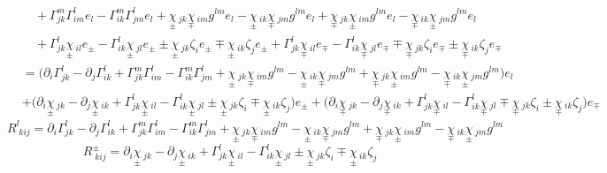 \documentclass[a4paper,11pt]{article}
\numberwithin{equation}{section}
\theoremstyle{definition}
\begin{document}
\begin{align*}
    &\quad + \Gamma_{jk}^m\Gamma_{im}^l e_l - \Gamma_{ik}^m\Gamma_{jm}^l e_l + \underset{\pm}{\chi}\,_{jk}\underset{\mp}{\chi}\,_{im}g^{lm} e_l - \underset{\pm}{\chi}\,_{ik}\underset{\mp}{\chi}\,_{jm}g^{lm} e_l + \underset{\mp}{\chi}\,_{jk}\underset{\pm}{\chi}\,_{im}g^{lm} e_l - \underset{\mp}{\chi}\,_{ik}\underset{\pm}{\chi}\,_{jm}g^{lm} e_l\\
    &\quad + \Gamma_{jk}^l\underset{\pm}{\chi}\,_{il} e_\pm - \Gamma_{ik}^l\underset{\pm}{\chi}\,_{jl} e_\pm \pm \underset{\pm}{\chi}\,_{jk}\zeta_i e_\pm \mp \underset{\pm}{\chi}\,_{ik}\zeta_j e_\pm + \Gamma_{jk}^l\underset{\mp}{\chi}\,_{il} e_\mp - \Gamma_{ik}^l\underset{\mp}{\chi}\,_{jl} e_\mp \mp \underset{\mp}{\chi}\,_{jk}\zeta_i e_\mp \pm \underset{\mp}{\chi}\,_{ik}\zeta_j e_\mp\\
    &= \Big(\partial_i\Gamma_{jk}^l - \partial_j\Gamma_{ik}^l + \Gamma_{jk}^m\Gamma_{im}^l - \Gamma_{ik}^m\Gamma_{jm}^l + \underset{\pm}{\chi}\,_{jk}\underset{\mp}{\chi}\,_{im}g^{lm} - \underset{\pm}{\chi}\,_{ik}\underset{\mp}{\chi}\,_{jm}g^{lm} + \underset{\mp}{\chi}\,_{jk}\underset{\pm}{\chi}\,_{im}g^{lm} - \underset{\mp}{\chi}\,_{ik}\underset{\pm}{\chi}\,_{jm}g^{lm} \Big) e_l\\
    &+\!\!\Big(\!\partial_i\underset{\pm}{\chi}\,_{jk}\!-\!\partial_j\underset{\pm}{\chi}\,_{ik}\!+\!\Gamma_{jk}^l\underset{\pm}{\chi}\,_{il}\!-\!\!\Gamma_{ik}^l\underset{\pm}{\chi}\,_{jl}\!\pm\!\underset{\pm}{\chi}\,_{jk}\zeta_i\!\mp\!\underset{\pm}{\chi}\,_{ik}\zeta_j\!\Big)e_\pm\!\!+\!\!\Big(\!\!\partial_i\underset{\mp}{\chi}\,_{jk}\!\!-\!\partial_j\underset{\mp}{\chi}\,_{ik}\!\!+\!\Gamma_{jk}^l\underset{\mp}{\chi}\,_{il}\!-\!\Gamma_{ik}^l\underset{\mp}{\chi}\,_{jl}\!\mp\!\underset{\mp}{\chi}\,_{jk}\zeta_i\!\pm\!\underset{\mp}{\chi}\,_{ik}\zeta_j\!\Big) e_\mp
\end{align*}
\begin{equation}
    \boxed{R^l_{\;kij}=\partial_i\Gamma_{jk}^l \!-\! \partial_j\Gamma_{ik}^l \!+\! \Gamma_{jk}^m\Gamma_{im}^l \!-\! \Gamma_{ik}^m\Gamma_{jm}^l \!+\! \underset{\pm}{\chi}\,_{jk}\underset{\mp}{\chi}\,_{im}g^{lm} \!-\! \underset{\pm}{\chi}\,_{ik}\underset{\mp}{\chi}\,_{jm}g^{lm} \!+\! \underset{\mp}{\chi}\,_{jk}\underset{\pm}{\chi}\,_{im}g^{lm} \!-\! \underset{\mp}{\chi}\,_{ik}\underset{\pm}{\chi}\,_{jm}g^{lm}}
\end{equation}
\begin{equation}
    \boxed{R^\pm_{\;kij}=\partial_i\underset{\pm}{\chi}\,_{jk}-\partial_j\underset{\pm}{\chi}\,_{ik}+\Gamma_{jk}^l\underset{\pm}{\chi}\,_{il}-\Gamma_{ik}^l\underset{\pm}{\chi}\,_{jl}\pm\underset{\pm}{\chi}\,_{jk}\zeta_i\mp\underset{\pm}{\chi}\,_{ik}\zeta_j}
\end{equation}
\end{document}
